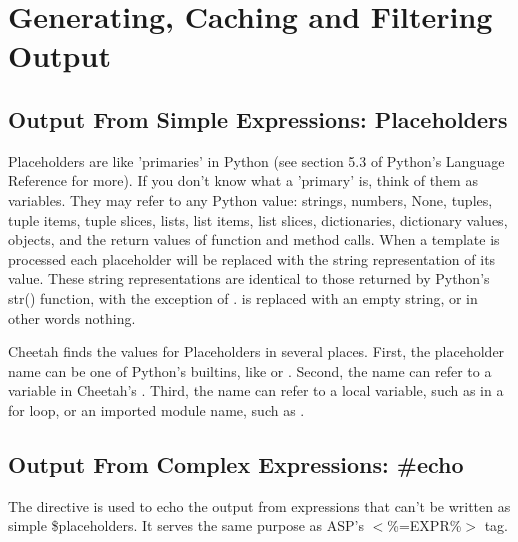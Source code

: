 \section{Generating, Caching and Filtering Output}
\label{output}

\subsection{Output From Simple Expressions: Placeholders}
\label{output.placeholders}

Placeholders are like 'primaries' in Python (see section 5.3 of Python's
Language Reference for more). If you don't know what a 'primary' is, think of
them as variables. They may refer to any Python value: strings, numbers, None,
tuples, tuple items, tuple slices, lists, list items, list slices, dictionaries,
dictionary values, objects, and the return values of function and method calls.
When a template is processed each placeholder will be replaced with the string
representation of its value.  These string representations are identical to
those returned by Python's str() function, with the exception of .
 is replaced with an empty string, or in other words nothing.

Cheetah finds the values for Placeholders in several places.  First, the
placeholder name can be one of Python's builtins, like  or
.  Second, the name can refer to a variable in Cheetah's
.  Third, the name can refer to a local variable, such as
 in a for loop, or an imported module name, such as .

\subsection{Output From Complex Expressions: \#echo}
\label{output.echo}

The  directive is used to echo the output from expressions that
can't be written as simple \$placeholders.  It serves the same purpose as ASP's
$<$\%=EXPR\%$>$ tag.


